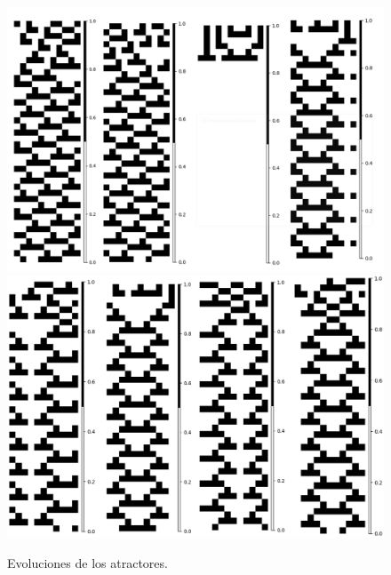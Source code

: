 \documentclass[11pt]{article}
\begin{document}
			\begin{figure}[H]
			\centering
			\includegraphics[scale=0.3]{resources/Atractores22/atractor_22_size_11_res.png}
			\includegraphics[scale=0.3]{resources/Atractores22/atractor_22_size_11_res1.png}
			\caption{Evoluciones de los atractores.}\label{fig:picture}
			\end{figure}
\end{document}
